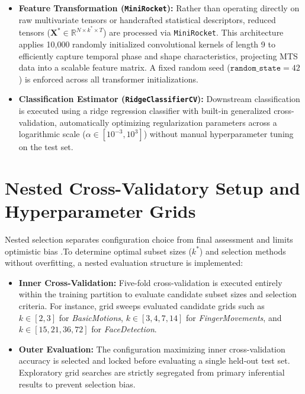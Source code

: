 \begin{itemize}
    \item \textbf{Feature Transformation (\texttt{MiniRocket}):} Rather than operating directly on raw multivariate tensors or handcrafted statistical descriptors, reduced tensors ($\mathbf{X}^* \in \mathbb{R}^{N \times k^* \times T}$) are processed via \texttt{MiniRocket}. This architecture applies 10,000 randomly initialized convolutional kernels of length 9 to efficiently capture temporal phase and shape characteristics, projecting MTS data into a scalable feature matrix. A fixed random seed ($\texttt{random\_state} = 42$) is enforced across all transformer initializations.
    \item \textbf{Classification Estimator (\texttt{RidgeClassifierCV}):} Downstream classification is executed using a ridge regression classifier with built-in generalized cross-validation, automatically optimizing regularization parameters across a logarithmic scale ($\alpha \in [10^{-3}, 10^3]$) without manual hyperparameter tuning on the test set.
\end{itemize}

\section{Nested Cross-Validatory Setup and Hyperparameter Grids}
\label{sec:nested_cv}

\noindent
Nested selection separates configuration choice from final assessment and
limits optimistic bias
\citep{varma2006bias,cawley2010overfitting}.To determine optimal subset sizes ($k^*$) and selection methods without overfitting, a nested evaluation structure is implemented:

\begin{itemize}
    \item \textbf{Inner Cross-Validation:} Five-fold cross-validation is executed entirely within the training partition to evaluate candidate subset sizes and selection criteria. For instance, grid sweeps evaluated candidate grids such as $k \in [2, 3]$ for \textit{BasicMotions}, $k \in [3, 4, 7, 14]$ for \textit{FingerMovements}, and $k \in [15, 21, 36, 72]$ for \textit{FaceDetection}.
    \item \textbf{Outer Evaluation:} The configuration maximizing inner cross-validation accuracy is selected and locked before evaluating a single held-out test set. Exploratory grid searches are strictly segregated from primary inferential results to prevent selection bias.
\end{itemize}

